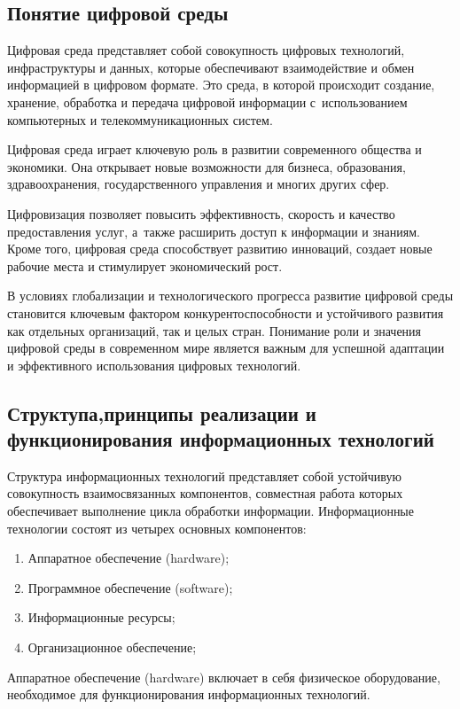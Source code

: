 \documentclass{ou}
\begin{document}
\subsection{Понятие цифровой среды}
Цифровая среда представляет собой совокупность цифровых технологий, инфраструктуры и данных, которые обеспечивают взаимодействие и обмен информацией в цифровом формате. Это среда, в которой происходит создание, хранение, обработка и передача цифровой информации с~использованием компьютерных и телекоммуникационных систем.

Цифровая среда играет ключевую роль в развитии современного общества и экономики. Она открывает новые возможности для бизнеса, образования, здравоохранения, государственного управления и многих других сфер.

Цифровизация позволяет повысить эффективность, скорость и качество предоставления услуг, а~также расширить доступ к информации и знаниям. Кроме того, цифровая среда способствует развитию инноваций, создает новые рабочие места и стимулирует экономический рост.

В условиях глобализации и технологического прогресса развитие цифровой среды становится ключевым фактором конкурентоспособности и устойчивого развития как отдельных организаций, так и целых стран. Понимание роли и значения цифровой среды в современном мире является важным для успешной адаптации и эффективного использования цифровых технологий.
\subsection{Структупа,принципы реализации и функционирования информационных технологий}

Структура информационных технологий представляет собой устойчивую совокупность взаимосвязанных компонентов, совместная работа которых обеспечивает выполнение цикла обработки информации. Информационные технологии состоят из четырех основных компонентов: 
\begin{enumerate}[itemindent=4em, nosep, label=\arabic*)]
    \item Аппаратное обеспечение (hardware);
    \item Программное обеспечение (software);
    \item Информационные ресурсы;
    \item Организационное обеспечение;
\end{enumerate}

Аппаратное обеспечение (hardware) включает в себя физическое оборудование, необходимое для функционирования информационных технологий.
\end{document}
